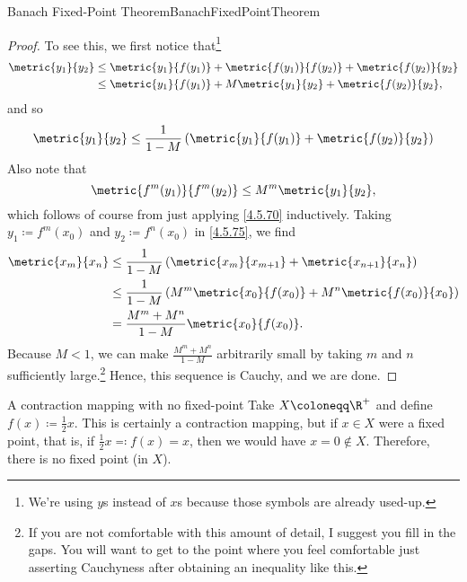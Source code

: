 \begin{thm}{Banach Fixed-Point Theorem}{BanachFixedPointTheorem}
\begin{proof}
To see this, we first notice that\footnote{We're using $y$s instead of $x$s because those symbols are already used-up.}
\begin{equation*}
\begin{split}
\metric{y_1}{y_2} & \leq \metric{y_1}{f(y_1)}+\metric{f(y_1)}{f(y_2)}+\metric{f(y_2)}{y_2} \\
& \leq \metric{y_1}{f(y_1)}+M\metric{y_1}{y_2}+\metric{f(y_2)}{y_2},
\end{split}
\end{equation*}
and so
\begin{equation}\label{4.5.75}
\metric{y_1}{y_2}\leq \frac{1}{1-M}\left( \metric{y_1}{f(y_1)}+\metric{f(y_2)}{y_2}\right) 
\end{equation}
Also note that
\begin{equation}
\metric{f^m(y_1)}{f^m(y_2)}\leq M^m\metric{y_1}{y_2},
\end{equation}
which follows of course from just applying \eqref{4.5.70} inductively.  Taking $y_1\coloneqq f^m(x_0)$ and $y_2\coloneqq f^n(x_0)$ in \eqref{4.5.75}, we find
\begin{equation*}
\begin{split}
\metric{x_m}{x_n} & \leq \frac{1}{1-M}\left( \metric{x_m}{x_{m+1}}+\metric{x_{n+1}}{x_n}\right) \\
& \leq \frac{1}{1-M}\left( M^m\metric{x_0}{f(x_0)}+M^n\metric{f(x_0)}{x_0}\right) \\
& =\frac{M^m+M^n}{1-M}\metric{x_0}{f(x_0)}.
\end{split}
\end{equation*}
Because $M<1$, we can make $\frac{M^m+M^n}{1-M}$ arbitrarily small by taking $m$ and $n$ sufficiently large.\footnote{If you are not comfortable with this amount of detail, I suggest you fill in the gaps.  You will want to get to the point where you feel comfortable just asserting Cauchyness after obtaining an inequality like this.}  Hence, this sequence is Cauchy, and we are done.
\end{proof}
\end{thm}
\begin{exm}{A contraction mapping with no fixed-point}{}
Take $X\coloneqq \R ^+$ and define $f(x)\coloneqq \frac{1}{2}x$.  This is certainly a contraction mapping, but if $x\in X$ were a fixed point, that is, if $\frac{1}{2}x\eqqcolon f(x)=x$, then we would have $x=0\notin X$.  Therefore, there is no fixed point (in $X$).
\end{exm}